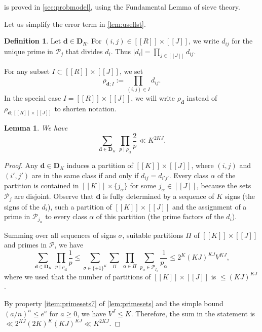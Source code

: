 \documentclass[11pt]{amsart}
\newtheorem{lemma}[theorem]{Lemma}
\theoremstyle{definition}
\newtheorem{definition}[theorem]{Definition}
\renewcommand{\leq}{\leqslant}
\renewcommand{\geq}{\geqslant}
\newcommand{\sinterval}[1]{[\![#1]\!] }
\newcommand{\abs}[1]{\left|#1\right|}
\newcommand{\primes}{\mathcal{P}}
\renewcommand{\d}{\boldsymbol{d}}
\newcommand{\pcomp}[2]{d_{#1#2}}
\newcommand{\curlyL}{V}
\newcommand{\fprod}[1]{\rho_{#1}}
\newcommand{\pall}{\fprod{\d}}
\newcommand{\fancyD}{\mathbf{D}}
\newcommand{\Dsf}{\fancyD_{\!\repK}}
\newcommand{\DsfR}{\fancyD_{\!\tupsize}}
\newcommand{\repR}{J}
\newcommand{\repK}{K}
\newcommand{\newK}{\sinterval{K}}
\newcommand{\newR}{\sinterval{J}}
\newcommand{\newerKR}{\newK\times\newR}
\newcommand{\newerKRR}{\sinterval{\tupsize}\times\newR}
\newcommand{\tupsize}{R}
\newcommand{\somesigns}{\sigma}
\begin{document}
 is proved in \cref{sec:probmodel}, using the Fundamental Lemma of sieve theory.

Let us simplify the error term in \cref{lem:useflst}.

\begin{definition}
\label{def:pij}
Let $\d\in \DsfR$. For $(i,j)\in \newerKRR$, we write $\pcomp{i}{j}$ for the unique prime in $\primes_j$ that divides $d_i$. Thus $\abs{d_i} = \prod_{j\in \newR} \pcomp{i}{j}$.

For any subset ${I}\subset \newerKRR$, we set
\begin{equation*}
	\fprod{{\d;I}} := \prod_{(i,j)\in {I}} \pcomp{i}{j}.
\end{equation*}
In the special case ${I} = \newerKRR$, we will write $\pall$ instead of $\fprod{\d;\newerKRR}$ to shorten notation.
\end{definition}

\begin{lemma}
\label{lem:trivialbound}
We have
\begin{equation*}
\sum_{\d\in \Dsf} \, \prod_{p\mid \pall}\frac{2}{p} \ll\repK^{2\repK \repR}.
\end{equation*}
\end{lemma}
\begin{proof}
Any $\d\in \Dsf$ induces a partition of $\newerKR$, where $(i,j)$ and $(i',j')$ are in the same class if and only if $\pcomp{i}{j} = \pcomp{i'}{j'}$. Every class $\alpha$ of the partition is contained in $\newK\times \{j_{\alpha}\}$ for some $j_{\alpha}\in \newR$, because the sets $\primes_j$ are disjoint. Observe that $\d$ is fully determined by a sequence of $\repK$ signs (the signs of the $d_i$), such a partition of $\newerKR$ and the assignment of a prime in $\primes_{\! j_{\alpha}}$ to every class $\alpha$ of this partition (the prime factors of the $d_i$). 

Summing over all sequences of signs $\somesigns$, suitable partitions $\Pi$ of $\newerKR$ and primes in $\primes$, we have
\begin{equation*}
\sum_{\d\in \Dsf} \, \prod_{p\mid \pall} \frac{1}{p} \leq  \sum_{\somesigns\in \{\pm1\}^{\repK}} \sum_{\Pi} \,\prod_{\alpha\in \Pi} \,\sum_{p_{\alpha}\in \primes_{\!j_{\alpha}}} \frac{1}{p_{\alpha}} \leq 2^{\repK} (\repK \repR)^{\repK \repR} \curlyL^{\repK \repR},
\end{equation*}
where we used that the number of partitions of $\newerKR$ is $\leq (\repK \repR)^{\repK \repR}$.

By property \cref{item:primesets7} of \cref{lem:primesets} and the simple bound $(a/n)^n \leq e^a$ for $a\geq 0$, we have $\curlyL^{\repR} \leq \repK$. Therefore, the sum in the statement is $\ll 2^{\repK\repR}(2\repK)^{\repK} (\repK \repR)^{\repK \repR} \ll\repK^{2\repK \repR}$.
\end{proof}
\end{document}
